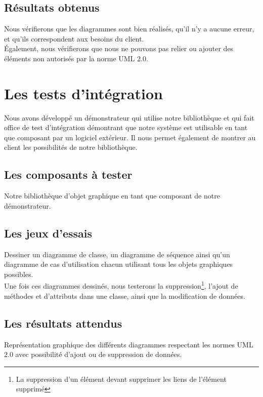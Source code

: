 \documentclass[12pt,a4paper,openany]{report}
\begin{document}
		\subsection{Résultats obtenus}
		Nous vérifierons que les diagrammes sont bien réalisés, qu'il n'y a aucune erreur, et qu'ils correspondent aux besoins du client.\\
		Également, nous vérifierons que nous ne pouvons pas relier ou ajouter des éléments non autorisés par la norme UML 2.0.

	\section{Les tests d'intégration}
		Nous avons développé un démonstrateur qui utilise notre bibliothèque et qui fait office de test d'intégration démontrant que notre système
		est utilisable en tant que composant par un logiciel extérieur. Il nous permet également de montrer au client les possibilités de notre bibliothèque.

		\subsection{Les composants à tester}
			Notre bibliothèque d'objet graphique en tant que composant de notre démonstrateur.

			\subsection{Les jeux d'essais}
			Dessiner un diagramme de classe, un diagramme de séquence ainsi qu'un diagramme de cas d'utilisation chacun utilisant tous les objets graphiques 
			possibles. \\
			Une fois ces diagrammes dessinés, nous testerons la suppression\footnote{La suppression d'un élément devant supprimer les liens de l'élément supprimé},
			l'ajout de méthodes et d'attributs dans une classe, ainsi que la modification de données.

			\subsection{Les résultats attendus}
			Représentation graphique des différents diagrammes respectant les normes UML 2.0 avec possibilité d'ajout ou de suppression de données.
			\newpage
\end{document}
